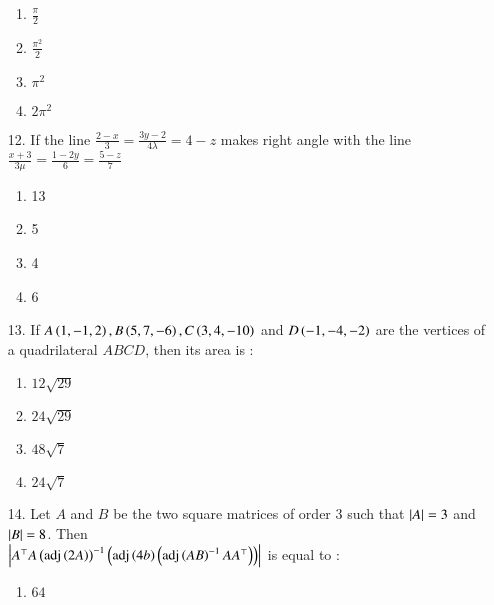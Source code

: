 \documentclass[journal,12pt,onecolumn]{IEEEtran}
\theoremstyle{remark}
\begin{document}
\begin{enumerate}
	\begin{multicols}{4}
		\begin{enumerate}
            \item $\frac{\pi}{2}$ \columnbreak
            \item $\frac{\pi ^ 2}{2}$ \columnbreak
            \item $\pi ^ 2$ \columnbreak
			\item $2\pi ^2 $
		\end{enumerate}
	\end{multicols}
\item[12.] If the line $\frac{2-x}{3} = \frac{3y-2}{4\lambda} = 4-z$ makes right angle with 
    the line $\frac{x+3}{3\mu} = \frac{1-2y}{6} = \frac{5-z}{7}$
		\hfill{}
		\begin{multicols}{4}
		\begin{enumerate}
			\item 13 \columnbreak
			\item 5 \columnbreak 
			\item 4 \columnbreak
			\item 6
		\end{enumerate}
        \end{multicols}
    \item[13.] If $A\left(1, -1, 2\right), B\left(5, 7, -6\right), C\left(3, 4, -10\right)$ and $D\left(-1, -4, -2\right)$ 
        are the vertices of a quadrilateral $ABCD$, then its area is :
		\hfill{\brak{2024-Apr}}
	\begin{multicols}{4}
		\begin{enumerate}
            \item $12\sqrt{29}$ \columnbreak
            \item $24\sqrt{29}$ \columnbreak
            \item $48\sqrt{7}$ \columnbreak
            \item $24\sqrt{7}$
		\end{enumerate}
	\end{multicols}
\item[14.] Let $A$ and $B$ be the two square matrices of order 3 such that $\left\vert A\right\vert = 3$ 
    and $\left\vert B\right\vert = 8$. Then\\ 
    $\left\vert A^{\top}A\left(\textnormal{adj}\left(2A\right)\right)^{-1}\left(\textnormal{adj}\left(4b\right)\left(\textnormal{adj}\left(AB\right)^{-1}AA^{\top}\right)\right)\right\vert$
    is equal to :
		\hfill{}
	\begin{multicols}{4}
		\begin{enumerate}
            \item $64$ \columnbreak

\end{enumerate}
\end{multicols}
\end{enumerate}
\end{document}
